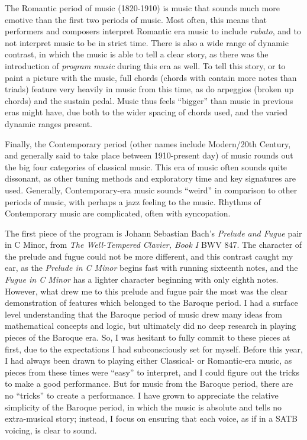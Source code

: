 The Romantic period of music (1820-1910) is music that sounds much more emotive than the first two periods of music. Most often, this means that performers and composers interpret Romantic era music to include \textit{rubato}, and to not interpret music to be in strict time. There is also a wide range of dynamic contrast, in which the music is able to tell a clear story, as there was the introduction of \textit{program music} during this era as well. To tell this story, or to paint a picture with the music, full chords (chords with contain more notes than triads) feature very heavily in music from this time, as do arpeggios (broken up chords) and the sustain pedal. Music thus feels ``bigger'' than music in previous eras might have, due both to the wider spacing of chords used, and the varied dynamic ranges present. 

Finally, the Contemporary period (other names include Modern/20th Century, and generally said to take place between 1910-present day) of music rounds out the big four categories of classical music. This era of music often sounds quite dissonant, as other tuning methods and exploratory time and key signatures are used. Generally, Contemporary-era music sounds ``weird'' in comparison to other periods of music, with perhaps a jazz feeling to the music. Rhythms of Contemporary music are complicated, often with syncopation. 

The first piece of the program is Johann Sebastian Bach's \textit{Prelude and Fugue} pair in C Minor, from \textit{The Well-Tempered Clavier, Book I} BWV 847. The character of the prelude and fugue could not be more different, and this contrast caught my ear, as the \textit{Prelude in C Minor} begins fast with running sixteenth notes, and the \textit{Fugue in C Minor} has a lighter character beginning with only eighth notes. However, what drew me to this prelude and fugue pair the most was the clear demonstration of features which belonged to the Baroque period. I had a surface level understanding that the Baroque period of music drew many ideas from mathematical concepts and logic, but ultimately did no deep research in playing pieces of the Baroque era. So, I was hesitant to fully commit to these pieces at first, due to the expectations I had subconsciously set for myself. Before this year, I had always been drawn to playing either Classical- or Romantic-era music, as pieces from these times were ``easy'' to interpret, and I could figure out the tricks to make a good performance. But for music from the Baroque period, there are no ``tricks'' to create a performance. I have grown to appreciate the relative simplicity of the Baroque period, in which the music is absolute and tells no extra-musical story; instead, I focus on ensuring that each voice, as if in a SATB voicing, is clear to sound.

